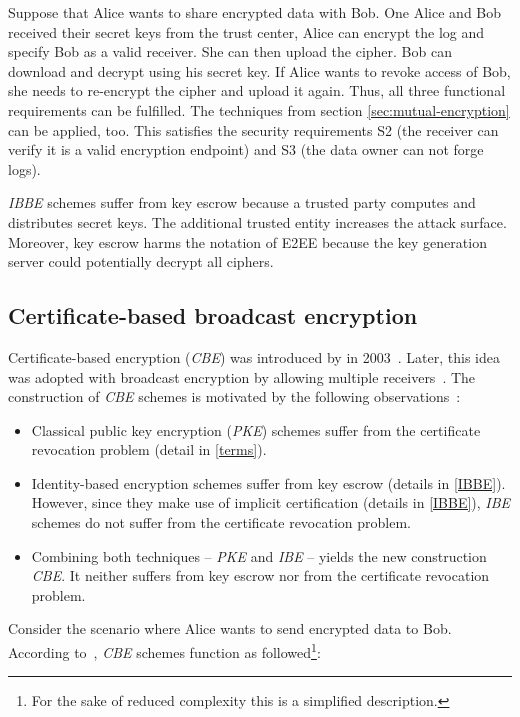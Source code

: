 \documentclass[../main.tex]{subfiles}
\begin{document}
Suppose that Alice wants to share encrypted data with Bob.
One Alice and Bob received their secret keys from the trust center, Alice can encrypt the log and specify Bob as a valid receiver.
She can then upload the cipher.
Bob can download and decrypt using his secret key.
If Alice wants to revoke access of Bob, she needs to re-encrypt the cipher and upload it again.
Thus, all three functional requirements can be fulfilled.
The techniques from section \ref{sec:mutual-encryption} can be applied, too.
This satisfies the security requirements S2 (the receiver can verify it is a valid encryption endpoint) and S3 (the data owner can not forge logs).

\textit{IBBE} schemes suffer from key escrow because a trusted party computes and distributes secret keys.
The additional trusted entity increases the attack surface.
Moreover, key escrow harms the notation of E2EE because the key generation server could potentially decrypt all ciphers.

\subsection{Certificate-based broadcast encryption}
Certificate-based encryption (\textit{CBE}) was introduced by \citeauthor{Gentry2003} in 2003~\cite{Gentry2003}. 
Later, this idea was adopted with broadcast encryption by allowing multiple receivers~\cite{Li2018, Fan2013}.
The construction of \textit{CBE} schemes is motivated by the following observations~\cite{Gentry2003}:

\begin{itemize}
    \item Classical public key encryption (\textit{PKE}) schemes suffer from the certificate revocation problem (detail in \cref{terms}).
    \item Identity-based encryption schemes suffer from key escrow (details in \cref{IBBE}).
    However, since they make use of implicit certification (details in \cref{IBBE}), \textit{IBE} schemes do not suffer from the certificate revocation problem.
    \item Combining both techniques -- \textit{PKE} and \textit{IBE} -- yields the new construction \textit{CBE}. 
    It neither suffers from key escrow nor from the certificate revocation problem.
\end{itemize}

Consider the scenario where Alice wants to send encrypted data to Bob. 
According to~\cite{Gentry2003}, \textit{CBE} schemes function as followed\footnote{For the sake of reduced complexity this is a simplified description.}:
\end{document}
